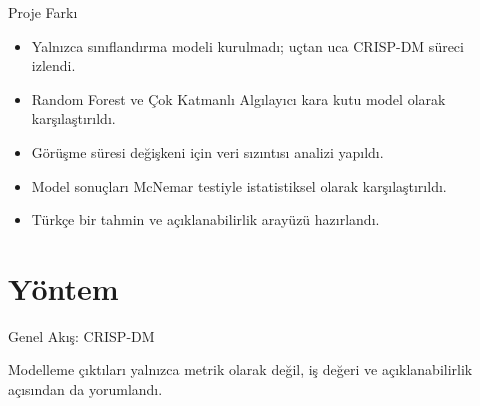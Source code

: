 \documentclass[aspectratio=169]{beamer}
\begin{document}
\begin{frame}{Proje Farkı}
    \begin{itemize}
        \item Yalnızca sınıflandırma modeli kurulmadı; uçtan uca CRISP-DM süreci izlendi.
        \item Random Forest ve Çok Katmanlı Algılayıcı kara kutu model olarak karşılaştırıldı.
        \item Görüşme süresi değişkeni için veri sızıntısı analizi yapıldı.
        \item Model sonuçları McNemar testiyle istatistiksel olarak karşılaştırıldı.
        \item Türkçe bir tahmin ve açıklanabilirlik arayüzü hazırlandı.
    \end{itemize}
\end{frame}

\section{Yöntem}

\begin{frame}{Genel Akış: CRISP-DM}
    \centering

    \vspace{0.4cm}
    \small Modelleme çıktıları yalnızca metrik olarak değil, iş değeri ve açıklanabilirlik açısından da yorumlandı.
\end{frame}
\end{document}

